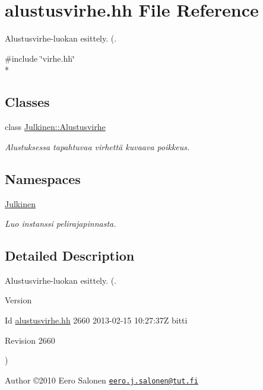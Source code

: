 \hypertarget{alustusvirhe_8hh}{}\section{alustusvirhe.\+hh File Reference}
\label{alustusvirhe_8hh}


Alustusvirhe-\/luokan esittely. (.  


{\ttfamily \#include \char`\"{}virhe.\+hh\char`\"{}}\\*
\subsection*{Classes}
\begin{DoxyCompactItemize}
\item 
class \hyperlink{class_julkinen_1_1_alustusvirhe}{Julkinen\+::\+Alustusvirhe}
\begin{DoxyCompactList}\small\item\em Alustuksessa tapahtuvaa virhettä kuvaava poikkeus. \end{DoxyCompactList}\end{DoxyCompactItemize}
\subsection*{Namespaces}
\begin{DoxyCompactItemize}
\item 
 \hyperlink{namespace_julkinen}{Julkinen}
\begin{DoxyCompactList}\small\item\em Luo instanssi pelirajapinnasta. \end{DoxyCompactList}\end{DoxyCompactItemize}


\subsection{Detailed Description}
Alustusvirhe-\/luokan esittely. (. 

\begin{DoxyVersion}{Version}

\end{DoxyVersion}
\begin{DoxyParagraph}{Id}
\hyperlink{alustusvirhe_8hh}{alustusvirhe.\+hh} 2660 2013-\/02-\/15 10\+:27\+:37\+Z bitti 
\end{DoxyParagraph}


\begin{DoxyParagraph}{Revision}
2660 
\end{DoxyParagraph}
) \begin{DoxyAuthor}{Author}
©2010 Eero Salonen \href{mailto:eero.j.salonen@tut.fi}{\tt eero.\+j.\+salonen@tut.\+fi} 
\end{DoxyAuthor}
